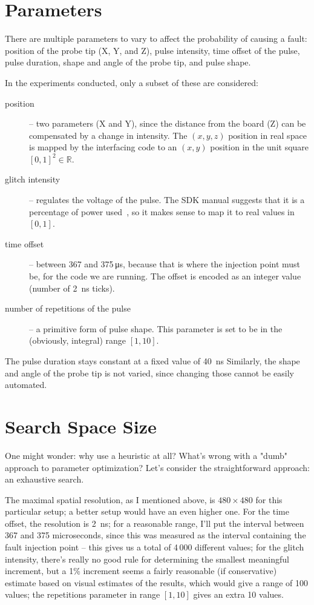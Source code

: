 \documentclass[times, utf8, diplomski]{fer}
\begin{document}
\section{Parameters}\label{sec:parameters}
There are multiple parameters to vary to affect the probability of causing a
fault: position of the probe tip (X, Y, and Z), pulse intensity, time offset
of the pulse, pulse duration, shape and angle of the probe tip, and pulse shape.

In the experiments conducted, only a subset of these are considered:
\begin{description}
  \item[position] -- two parameters (X and Y), since the distance from the board
        (Z) can be compensated by a change in intensity. The $(x,y,z)$ position
        in real space is mapped by the interfacing code to an $(x,y)$ position
        in the unit square $[0,1]^2 \in \mathbb{R}$.
  \item[glitch intensity] -- regulates the voltage of the pulse. The SDK manual
        suggests that it is a percentage of power used~\cite{RiscureVCGmanual},
        so it makes sense to map it to real values in $[0,1]$.
  \item[time offset] -- between 367 and 375\,\si{\micro\second}, because that is
        where the injection point must be, for the code we are running. The offset
        is encoded as an integer value (number of \SI{2}{\nano\second} ticks).
  \item[number of repetitions of the pulse] -- a primitive form of pulse shape.
        This parameter is set to be in the (obviously, integral) range $[1, 10]$.
\end{description}

The pulse duration stays constant at a fixed value of \SI{40}{\nano\second} Similarly, the shape
and angle of the probe tip is not varied, since changing those cannot be easily
automated.



\section{Search Space Size}\label{sec:search_space}
One might wonder: why use a heuristic at all? What's wrong with a "dumb"
approach to parameter optimization? Let's consider the straightforward
approach: an exhaustive search.

The maximal spatial resolution, as I mentioned above, is $480 \times 480$ for
this particular setup; a better setup would have an even higher one. For the
time offset, the resolution is \SI{2}{\nano\second}; for a reasonable range,
I'll put the interval between 367 and 375 microseconds, since this was measured
as the interval containing the fault injection point -- this gives us a total of
4\,000 different values; for the glitch intensity, there's really no good rule
for determining the smallest meaningful increment, but a 1\% increment seems
a fairly reasonable (if conservative) estimate based on visual estimates of
the results, which would give a range of 100 values; the repetitions parameter
in range $[1,10]$ gives an extra 10 values.
\end{document}
